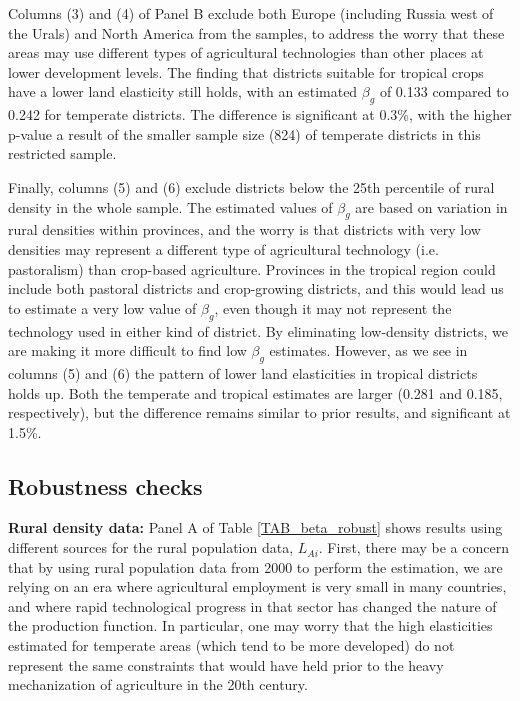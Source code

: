 \documentclass[11pt]{article}
\begin{document}
Columns (3) and (4) of Panel B exclude both Europe (including Russia west of the Urals) and North America from the samples, to address the worry that these areas may use different types of agricultural technologies than other places at lower development levels. The finding that districts suitable for tropical crops have a lower land elasticity still holds, with an estimated $\beta_g$ of 0.133 compared to 0.242 for temperate districts. The difference is significant at 0.3\%, with the higher p-value a result of the smaller sample size (824) of temperate districts in this restricted sample.

Finally, columns (5) and (6) exclude districts below the 25th percentile of rural density in the whole sample. The estimated values of $\beta_g$ are based on variation in rural densities within provinces, and the worry is that districts with very low densities may represent a different type of agricultural technology (i.e. pastoralism) than crop-based agriculture. Provinces in the tropical region could include both pastoral districts and crop-growing districts, and this would lead us to estimate a very low value of $\beta_g$, even though it may not represent the technology used in either kind of district. By eliminating low-density districts, we are making it more difficult to find low $\beta_g$ estimates. However, as we see in columns (5) and (6) the pattern of lower land elasticities in tropical districts holds up. Both the temperate and tropical estimates are larger (0.281 and 0.185, respectively), but the difference remains similar to prior results, and significant at 1.5\%.

\subsection{Robustness checks}
\vspace{.5cm}\noindent\textbf{Rural density data:} Panel A of Table \ref{TAB_beta_robust} shows results using different sources for the rural population data, $L_{Ai}$. First, there may be a concern that by using rural population data from 2000 to perform the estimation, we are relying on an era where agricultural employment is very small in many countries, and where rapid technological progress in that sector has changed the nature of the production function. In particular, one may worry that the high elasticities estimated for temperate areas (which tend to be more developed) do not represent the same constraints that would have held prior to the heavy mechanization of agriculture in the 20th century.
\end{document}
